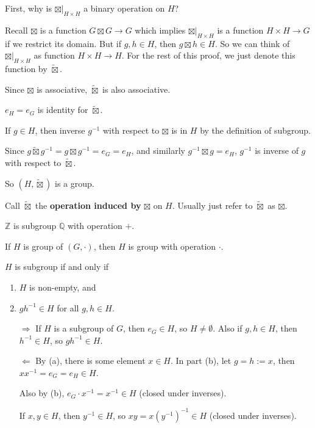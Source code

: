 \begin{pf}
First, why is $\boxtimes |_{H\times H}$ a binary operation on $H$?

Recall $\boxtimes$ is a function $G\boxtimes G\to G$ which implies $\boxtimes |_{H\times H}$ is a function $H\times H\to G$ if we restrict its domain. But if $g, h\in H$, then $g\boxtimes h\in H$. So we can think of $\boxtimes |_{H\times H}$ as function $H\times H\to H$. For the rest of this proof, we just denote this function by $\tilde{\boxtimes}$.

Since $\boxtimes$ is associative, $\tilde{\boxtimes}$ is also associative.

$e_H=e_G$ is identity for $\tilde{\boxtimes}$.

If $g\in H$, then inverse $g^{-1}$ with respect to $\boxtimes$ is in $H$ by the definition of subgroup.

Since $g\tilde{\boxtimes} g^{-1} = g\boxtimes g^{-1} = e_G = e_H$, and similarly $g^{-1}\boxtimes g = e_H$, $g^{-1}$ is inverse of $g$ with respect to $\tilde{\boxtimes}$.

So $(H,\tilde{\boxtimes})$ is a group.
\end{pf}

Call $\tilde{\boxtimes}$ the \textbf{operation induced by} $\boxtimes$ on $H$. Usually just refer to $\tilde{\boxtimes}$ as $\boxtimes$.

\begin{ex}
$\mathbb Z$ is subgroup $\mathbb Q$ with operation $+$.

If $H$ is group of $(G,\cdot)$, then $H$ is group with operation $\cdot$.
\end{ex}

\begin{prop}
$H$ is subgroup if and only if
\begin{enumerate}[label=(\alph*)]
\item $H$ is non-empty, and
\item $gh^{-1}\in H$ for all $g,h\in H$.
\end{enumerate}
\end{prop}

\begin{pf}
\begin{itemize}
\item[$\Rightarrow$]  If $H$ is a subgroup of $G$, then $e_G\in H$, so $H\ne \emptyset$. Also if $g,h\in H$, then $h^{-1}\in H$, so $gh^{-1}\in H$.
\item[$\Leftarrow$] By (a), there is some element $x\in H$. In part (b), let $g=h:= x$, then $xx^{-1}=e_G=e_H\in H$.

Also by (b), $e_G\cdot x^{-1}=x^{-1}\in H$ (closed under inverses).

If $x,y\in H$, then $y^{-1}\in H$, so $xy = x(y^{-1})^{-1}\in H$  (closed under inverses).
\end{itemize}
\end{pf}

